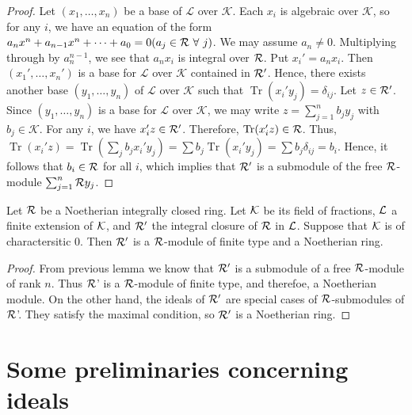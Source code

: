 \begin{proof}
  Let $(x_1,\ldots, x_n)$ be a base of $\mathcal{L}$ over $\mathcal{K}$. Each $x_i$ is algebraic over $\mathcal{K}$, so for any $i$, we have an equation of the form $a_n x^n + a_{n-1}x^{n}+\cdots+a_0 = 0 (a_j\in \mathcal{R}\ \forall\ j)$. We may assume $a_n \neq 0$. Multiplying through by $a_{n}^{n-1}$, we see that $a_n x_i$ is integral over $\mathcal{R}$.
  Put $x_i' = a_n x_i$. Then $(x_1', \ldots, x_n')$ is a base for $\mathcal{L}$ over $\mathcal{K}$ contained in $\mathcal{R}'$.
  Hence, there exists another base $(y_1,\ldots, y_n)$ of $\mathcal{L}$ over $\mathcal{K}$ such that $\operatorname{Tr}(x_i' y_j) = \delta_{ij}$. Let $z\in \mathcal{R}'$. Since $(y_1,\ldots, y_n)$ is a base for $\mathcal{L}$ over $\mathcal{K}$, we may write $z = \sum_{j=1}^n b_j y_j$ with $b_j\in \mathcal{K}$. For any
  $i$, we have $x_i' z\in \mathcal{R}'$. Therefore, $\operatorname{Tr}(x_i'z)\in \mathcal{R}$. Thus, $\operatorname{Tr}(x_i' z) = \operatorname{Tr}(\sum_{j}b_j x_i' y_j) = \sum b_j \operatorname{Tr}(x_i' y_j) = \sum b_j \delta_{ij} = b_i$. Hence, it follows that $b_i \in \mathcal{R}$ for all $i$, which implies that $\mathcal{R}'$ is a submodule of the free $\mathcal{R}$-module $\sum_{j=1}^n \mathcal{R} y_j$.
\end{proof}

\begin{prop}
  Let $\mathcal{R}$ be a Noetherian integrally closed ring. Let $\mathcal{K}$ be its field of fractions, $\mathcal{L}$ a finite extension of $\mathcal{K}$, and $\mathcal{R}'$ the integral closure of $\mathcal{R}$ in $\mathcal{L}$. Suppose that $\mathcal{K}$ is of charactersitic $0$. Then $\mathcal{R}'$ is a $\mathcal{R}$-module of finite type and a Noetherian ring.
\end{prop}


\begin{proof}
From previous lemma we know that $\mathcal{R}'$ is a submodule of a free $\mathcal{R}$-module of rank $n$. Thus $\mathcal{R}$' is a $\mathcal{R}$-module of finite type, and therefoe, a Noetherian module. On the other hand, the ideals of $\mathcal{R}'$ are special cases of $\mathcal{R}$-submodules of $\mathcal{R}$'. They satisfy the maximal condition, so $\mathcal{R}'$ is a Noetherian ring.
\end{proof}

\section{Some preliminaries concerning ideals}

